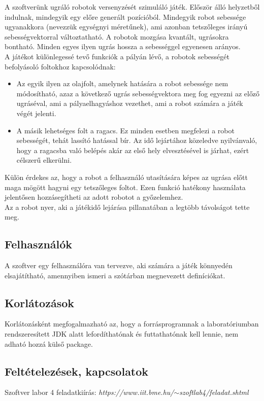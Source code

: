 A szoftverünk ugráló robotok versenyzését szimuláló játék. Először álló helyzetből indulnak, mindegyik egy előre generált pozícióból. Mindegyik robot sebessége ugyanakkora (nevezzük egységnyi méretűnek), ami azonban tetszőleges irányú sebességvektorral változtatható. A robotok mozgása kvantált, ugrásokra bontható. Minden egyes ilyen ugrás hossza a sebességgel egyenesen arányos. \\

A játékot különlegessé tevő funkciók a pályán lévő, a robotok sebességét befolyásoló foltokhoz kapcsolódnak:

\begin{itemize}
	\item Az egyik ilyen az olajfolt, amelynek hatására a robot sebessége nem módosítható, azaz a következő ugrás sebességvektora meg fog egyezni az előző ugráséval, ami a pályaelhagyáshoz vezethet, ami a robot számára a játék végét jelenti.
	\item A másik lehetséges folt a ragacs. Ez minden esetben megfelezi a robot sebességét, tehát lassító hatással bír. Az idő lejártához közeledve nyilvánvaló, hogy a ragacsba való belépés akár az első hely elvesztésével is járhat, ezért célszerű elkerülni.
\end{itemize}

Külön érdekes az, hogy a robot a felhasználó utasítására képes az ugrása előtt maga mögött hagyni egy tetszőleges foltot. Ezen funkció hatékony használata jelentősen hozzásegítheti az adott robotot a győzelemhez. \\

Az a robot nyer, aki a játékidő lejárása pillanatában a legtöbb távolságot tette meg.
 

\subsection{Felhasználók}

A szoftver egy felhasználóra van tervezve, aki számára a játék könnyedén elsajátítható, amennyiben ismeri a szótárban megnevezett definíciókat.

\subsection{Korlátozások}

Korlátozásként megfogalmazható az, hogy a forrásprogramnak a laboratóriumban rendszeresített JDK alatt lefordíthatónak és futtathatónak kell lennie, nem adható hozzá külső package.

\subsection{Feltételezések, kapcsolatok}

Szoftver labor 4 feladatkiírás: \textit{https://www.iit.bme.hu/$\sim$szoftlab4/feladat.shtml}